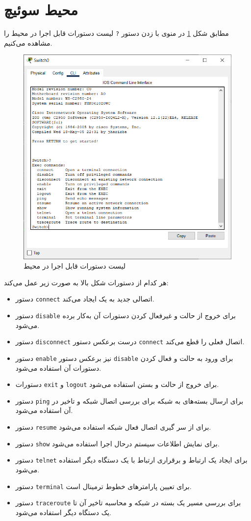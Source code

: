 \documentclass{article}
\newcommand{\code}[1]{\colorbox{codegray}{\texttt{#1}}}
\begin{document}
\section{محیط  سوئیچ}

مطابق شکل \ref{fig:user-excec-commands} در منوی  با زدن دستور \code{?} لیست دستورات قابل اجرا در محیط  را مشاهده می‌کنیم.
\begin{figure}[h!]
	\centering
	\includegraphics[width=0.6\columnwidth]{figs/user-excec-commands.jpg}
	\caption{لیست دستورات قابل اجرا در محیط }
	\label{fig:user-excec-commands}
\end{figure}

هر کدام از دستورات شکل بالا به صورت زیر عمل می‌کند:
\begin{itemize}
	\item 
	دستور \code{connect} اتصالی جدید به یک  ایجاد می‌کند.
	\item 
	دستور \code{disable} برای خروج از حالت  و غیرفعال کردن دستورات آن به‌کار برده می‌شود.
	\item 
	دستور \code{disconnect} درست برعکس دستور \code{connect} اتصال فعلی را قطع می‌کند.
	\item 
	دستور \code{enable} نیز برعکس دستور \code{disable} برای ورود به حالت  و فعال کردن دستورات آن استفاده می‌شود.
	\item 
	دستورات \code{exit}  و \code{logout} برای خروج از حالت  و بستن  استفاده می‌شود.
	\item 
	دستور \code{ping} برای ارسال بسته‌های  به شبکه برای بررسی اتصال شبکه و تاخیر در آن استفاده می‌شود.
	\item 
	دستور \code{resume} برای از سر گیری اتصال فعال شبکه استفاده می‌شود.
	\item 
	دستور \code{show} برای نمایش اطلاعات سیستم درحال اجرا استفاده می‌شود.
	\item 
	دستور \code{telnet} برای ایجاد یک ارتباط  و برقراری ارتباط با یک دستگاه دیگر استفاده می‌شود.
	\item 
	دستور \code{terminal} برای تعیین پارامترهای خطوط ترمینال است.
	\item 
	دستور \code{traceroute} برای بررسی مسیر یک بسته در شبکه و محاسبه تاخیر آن تا یک دستگاه دیگر استفاده می‌شود.
\end{itemize}
\end{document}
